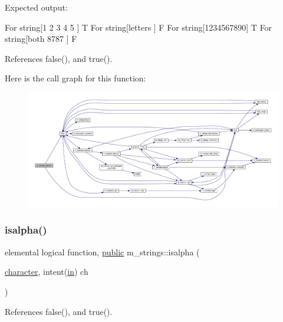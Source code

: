Expected output\+:

For string\mbox{[}1 2 3 4 5 \mbox{]} T For string\mbox{[}letters \mbox{]} F For string\mbox{[}1234567890\mbox{]} T For string\mbox{[}both 8787 \mbox{]} F 

References false(), and true().

Here is the call graph for this function\+:
\nopagebreak
\begin{figure}[H]
\begin{center}
\leavevmode
\includegraphics[width=350pt]{namespacem__strings_ad8fd9bbf618bdba2c3ac9fb3c8174362_cgraph}
\end{center}
\end{figure}
\mbox{\label{namespacem__strings_a5cf6d7fbd1b3ea17e37c6213c6ba0fdb}} 
\subsubsection{\texorpdfstring{isalpha()}{isalpha()}}
{\footnotesize\ttfamily elemental logical function, \hyperlink{M__stopwatch_83_8txt_a2f74811300c361e53b430611a7d1769f}{public} m\+\_\+strings\+::isalpha (\begin{DoxyParamCaption}\item[{\hyperlink{option__stopwatch_83_8txt_abd4b21fbbd175834027b5224bfe97e66}{character}, intent(\hyperlink{M__journal_83_8txt_afce72651d1eed785a2132bee863b2f38}{in})}]{ch }\end{DoxyParamCaption})}



References false(), and true().


